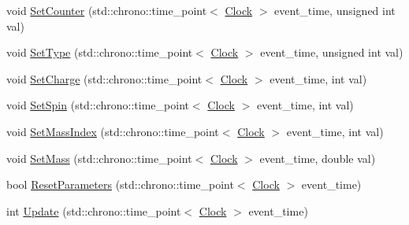 \begin{DoxyCompactItemize}
\item 
void \mbox{\hyperlink{classElementaryParticle_a141316fd968cce8ecc5aa11ce0757d63}{Set\+Counter}} (std\+::chrono\+::time\+\_\+point$<$ \mbox{\hyperlink{universe_8h_a0ef8d951d1ca5ab3cfaf7ab4c7a6fd80}{Clock}} $>$ event\+\_\+time, unsigned int val)
\item 
void \mbox{\hyperlink{classElementaryParticle_a37d7718faf6be68d4374bcc56816f30a}{Set\+Type}} (std\+::chrono\+::time\+\_\+point$<$ \mbox{\hyperlink{universe_8h_a0ef8d951d1ca5ab3cfaf7ab4c7a6fd80}{Clock}} $>$ event\+\_\+time, unsigned int val)
\item 
void \mbox{\hyperlink{classElementaryParticle_abbc6d3c58509c4121df55bfef716d2f1}{Set\+Charge}} (std\+::chrono\+::time\+\_\+point$<$ \mbox{\hyperlink{universe_8h_a0ef8d951d1ca5ab3cfaf7ab4c7a6fd80}{Clock}} $>$ event\+\_\+time, int val)
\item 
void \mbox{\hyperlink{classElementaryParticle_a437fa86d88157314b84662b158d52353}{Set\+Spin}} (std\+::chrono\+::time\+\_\+point$<$ \mbox{\hyperlink{universe_8h_a0ef8d951d1ca5ab3cfaf7ab4c7a6fd80}{Clock}} $>$ event\+\_\+time, int val)
\item 
void \mbox{\hyperlink{classElementaryParticle_a8a3b91409772f4091a782624a34024e7}{Set\+Mass\+Index}} (std\+::chrono\+::time\+\_\+point$<$ \mbox{\hyperlink{universe_8h_a0ef8d951d1ca5ab3cfaf7ab4c7a6fd80}{Clock}} $>$ event\+\_\+time, int val)
\item 
void \mbox{\hyperlink{classElementaryParticle_a778ff8188ecb369e533521ed4f94b034}{Set\+Mass}} (std\+::chrono\+::time\+\_\+point$<$ \mbox{\hyperlink{universe_8h_a0ef8d951d1ca5ab3cfaf7ab4c7a6fd80}{Clock}} $>$ event\+\_\+time, double val)
\item 
bool \mbox{\hyperlink{classElementaryParticle_ac0f85f34bdfc1d42324201eb7c38e85e}{Reset\+Parameters}} (std\+::chrono\+::time\+\_\+point$<$ \mbox{\hyperlink{universe_8h_a0ef8d951d1ca5ab3cfaf7ab4c7a6fd80}{Clock}} $>$ event\+\_\+time)
\item 
int \mbox{\hyperlink{classElementaryParticle_abf5114c3d032bc9511a14aa7368ec450}{Update}} (std\+::chrono\+::time\+\_\+point$<$ \mbox{\hyperlink{universe_8h_a0ef8d951d1ca5ab3cfaf7ab4c7a6fd80}{Clock}} $>$ event\+\_\+time)
\end{DoxyCompactItemize}
